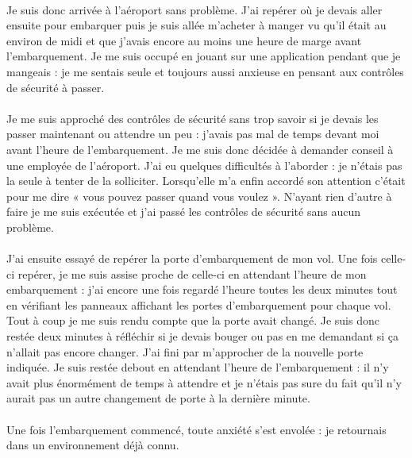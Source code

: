 \paragraph{}
Je suis donc arrivée à l’aéroport sans problème. J’ai repérer où je devais aller ensuite pour embarquer puis je suis allée m’acheter à manger vu qu’il était au environ de midi et que j’avais encore au moins une heure de marge avant l’embarquement. Je me suis occupé en jouant sur une application pendant que je mangeais : je me sentais seule et toujours aussi anxieuse en pensant aux contrôles de sécurité à passer. 
\paragraph{}
Je me suis approché des contrôles de sécurité sans trop savoir si je devais les passer maintenant ou attendre un peu : j’avais pas mal de temps devant moi avant l’heure de l’embarquement. Je me suis donc décidée à demander conseil à une employée de l’aéroport. J’ai eu quelques difficultés à l’aborder : je n’étais pas la seule à tenter de la solliciter. Lorsqu’elle m’a enfin accordé son attention c’était pour me dire « vous pouvez passer quand vous voulez ». N’ayant rien d’autre à faire je me suis exécutée et j’ai passé les contrôles de sécurité sans aucun problème.
\paragraph{}
J’ai ensuite essayé de repérer la porte d’embarquement de mon vol. Une fois celle-ci repérer, je me suis assise proche de celle-ci en attendant l’heure de mon embarquement : j’ai encore une fois regardé l’heure toutes les deux minutes tout en vérifiant les panneaux affichant les portes d’embarquement pour chaque vol. Tout à coup je me suis rendu compte que la porte avait changé. Je suis donc restée deux minutes à réfléchir si je devais bouger ou pas en me demandant si ça n’allait pas encore changer. J’ai fini par m’approcher de la nouvelle porte indiquée. Je suis restée debout en attendant l’heure de l’embarquement : il n’y avait plus énormément de temps à attendre et je n’étais pas sure du fait qu’il n’y aurait pas un autre changement de porte à la dernière minute. 
\paragraph{}
Une fois l’embarquement commencé, toute anxiété s’est envolée : je retournais dans un environnement déjà connu. 

